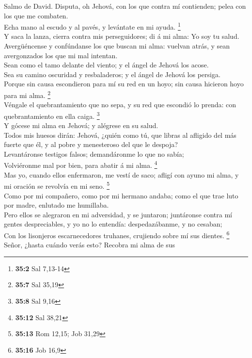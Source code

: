 Salmo de David. Disputa, oh Jehová, con los que contra mí
contienden; pelea con los que me combaten.\\
 Echa mano al escudo y al pavés, y levántate en mi ayuda.
\footnote{\textbf{35:2} Sal 7,13-14}\\
 Y saca la lanza, cierra contra mis perseguidores; di á mi
alma: Yo soy tu salud.\\
 Avergüéncense y confúndanse los que buscan mi alma: vuelvan
atrás, y sean avergonzados los que mi mal intentan.\\
 Sean como el tamo delante del viento; y el ángel de Jehová
los acose.\\
 Sea su camino oscuridad y resbaladeros; y el ángel de
Jehová los persiga.\\
 Porque sin causa escondieron para mí su red en un hoyo; sin
causa hicieron hoyo para mi alma. \footnote{\textbf{35:7} Sal 35,19}\\
 Véngale el quebrantamiento que no sepa, y su red que
escondió lo prenda: con quebrantamiento en ella caiga. \footnote{\textbf{35:8}
  Sal 9,16}\\
 Y gócese mi alma en Jehová; y alégrese en su salud.\\
 Todos mis huesos dirán: Jehová, ¿quién como tú, que libras
al afligido del más fuerte que él, y al pobre y menesteroso del que le
despoja?\\
 Levantáronse testigos falsos; demandáronme lo que no
sabía;\\
 Volviéronme mal por bien, para abatir á mi alma.
\footnote{\textbf{35:12} Sal 38,21}\\
 Mas yo, cuando ellos enfermaron, me vestí de saco; afligí
con ayuno mi alma, y mi oración se revolvía en mi seno. \footnote{\textbf{35:13}
  Rom 12,15; Job 31,29}\\
 Como por mi compañero, como por mi hermano andaba; como el
que trae luto por madre, enlutado me humillaba.\\
 Pero ellos se alegraron en mi adversidad, y se juntaron;
juntáronse contra mí gentes despreciables, y yo no lo entendía:
despedazábanme, y no cesaban;\\
 Con los lisonjeros escarnecedores truhanes, crujiendo
sobre mí sus dientes. \footnote{\textbf{35:16} Job 16,9}\\
 Señor, ¿hasta cuándo verás esto? Recobra mi alma de sus
